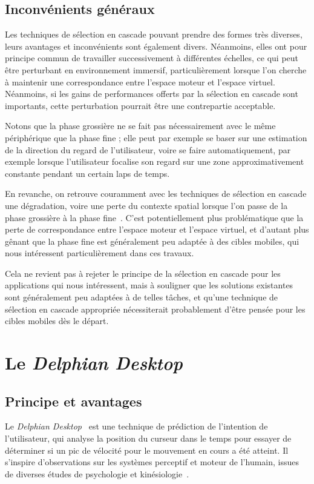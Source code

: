 	\subsection{Inconvénients généraux}
	Les techniques de sélection en cascade pouvant prendre des formes très diverses, leurs avantages et inconvénients sont également divers. Néanmoins, elles ont pour principe commun de travailler successivement à différentes échelles, ce qui peut être perturbant en environnement immersif, particulièrement lorsque l'on cherche à maintenir une correspondance entre l'espace moteur et l'espace virtuel. Néanmoins, si les gains de performances offerts par la sélection en cascade sont importants, cette perturbation pourrait être une contrepartie acceptable.
	
	Notons que la phase grossière ne se fait pas nécessairement avec le même périphérique que la phase fine ; elle peut par exemple se baser sur une estimation de la direction du regard de l'utilisateur, voire se faire automatiquement, par exemple lorsque l'utilisateur focalise son regard sur une zone approximativement constante pendant un certain laps de temps.
	
	En revanche, on retrouve couramment avec les techniques de sélection en cascade une dégradation, voire une perte du contexte spatial lorsque l'on passe de la phase grossière à la phase fine~\cite{kopper2011rapid, debarba2013disambiguation}. C'est potentiellement plus problématique que la perte de correspondance entre l'espace moteur et l'espace virtuel, et d'autant plus gênant que la phase fine est généralement peu adaptée à des cibles mobiles, qui nous intéressent particulièrement dans ces travaux.
	
	Cela ne revient pas à rejeter le principe de la sélection en cascade pour les applications qui nous intéressent, mais à souligner que les solutions existantes sont généralement peu adaptées à de telles tâches, et qu'une technique de sélection en cascade appropriée nécessiterait probablement d'être pensée pour les cibles mobiles dès le départ.	

	
\section{Le \emph{Delphian Desktop}}
	\subsection{Principe et avantages}
	Le \emph{Delphian Desktop}~\cite{asano2005predictive} est une technique de prédiction de l'intention de l'utilisateur, qui analyse la position du curseur dans le temps pour essayer de déterminer si un pic de vélocité pour le mouvement en cours a été atteint. Il s'inspire d'observations sur les systèmes perceptif et moteur de l'humain, issues de diverses études de psychologie et kinésiologie~\cite{accot2003refining, graham1995pointing, graham1996physical, mackenzie1992extending, mackenzie1994prediction, takagi2002fundamental, walker1993spatial}.
	
